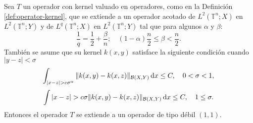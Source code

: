 \begin{theorem}
	Sea $T$ un operador con kernel valuado en operadores, como en la Definición \ref{def:operator-kernel}, que se extiende a un operador acotado de $L^2(\mathbb{T}^n; X)$ en $L^2(\mathbb{T}^n; Y)$ y de $L^q(\mathbb{T}^n; X)$ en $L^2(\mathbb{T}^n; Y)$ tal que para algunos $\alpha$ y $\beta$:
	\begin{equation}
		\frac{1}{q} = \frac{1}{2} + \frac{\beta}{n} ; \quad (1-\alpha)\frac{n}{2} \leq \beta < \frac{n}{2}.
		\label{eq:alpha_condition}
	\end{equation}
	También se asume que su kernel $k(x, y)$ satisface la siguiente condición cuando $|y-z|<\sigma$
	\begin{equation}
		\int_{|x-z|>c\sigma^\alpha}\|k(x, y)-k(x,z)\|_{\mathcal{B}(X, Y)}\diff x\leq C, \quad 0<\sigma < 1,
		\label{eq:hyp-sigma<1}
	\end{equation}
	\begin{equation}
		\int{|x-z|>c\sigma}\|k(x, y)-k(x,z)\|_{\mathcal{B}(X, Y)}\diff x \leq C , \quad 1 \leq \sigma.
		\label{eq:hyp-sgima>1}
	\end{equation}
	Entonces el operador $T$ se extiende a un operador de tipo débil $(1,1)$.
	\label{theo:L1-weak}
\end{theorem}
